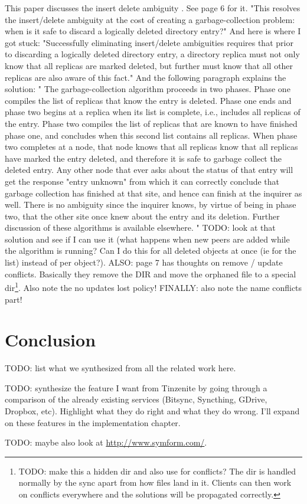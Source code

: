 This paper discusses the insert delete ambiguity \cite{page1998perspectives}.
See page 6 for it.
"This resolves the insert/delete ambiguity at the cost of creating a garbage-collection problem: when is it safe to discard a logically deleted directory entry?"
And here is where I got stuck: "Successfully eliminating insert/delete ambiguities requires that prior to discarding a logically deleted directory entry, a directory replica must not only know that all replicas are marked deleted, but further must know that all other replicas are also aware of this fact."
And the following paragraph explains the solution: "
The garbage-collection algorithm proceeds in two phases.
Phase one compiles the list of replicas that know the entry is deleted.
Phase one ends and phase two begins at a replica when its list is complete, i.e., includes all replicas of the entry.
Phase two compiles the list of replicas that are known to have finished phase one, and concludes when this second list contains all replicas.
When phase two completes at a node, that node knows that all replicas know that all replicas have marked the entry deleted, and therefore it is safe to garbage collect the deleted entry.
Any other node that ever asks about the status of that entry will get the response "entry unknown" from which it can correctly conclude that garbage collection has finished at that site, and hence can finish at the inquirer as well.
There is no ambiguity since the inquirer knows, by virtue of being in phase two, that the other site once knew about the entry and its deletion.
Further discussion of these algorithms is available elsewhere.
"
TODO: look at that solution and see if I can use it (what happens when new peers are added while the algorithm is running? Can I do this for all deleted objects at once (ie for the list) instead of per object?).
ALSO: page 7 has thoughts on remove / update conflicts.
Basically they remove the DIR and move the orphaned file to a special dir\footnote{TODO: make this a hidden dir and also use for conflicts? The dir is handled normally by the sync apart from how files land in it. Clients can then work on conflicts everywhere and the solutions will be propagated correctly.}.
Also note the no updates lost policy!
FINALLY: also note the name conflicts part!

\section{Conclusion}

TODO: list what we synthesized from all the related work here.

TODO: synthesize the feature I want from Tinzenite by going through a comparison of the already existing services (Bitsync, Syncthing, GDrive, Dropbox, etc).
Highlight what they do right and what they do wrong.
I'll expand on these features in the implementation chapter.

TODO: maybe also look at \url{http://www.symform.com/}.
